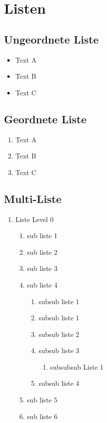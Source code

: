 \documentclass{scrreprt}
\begin{document}
	\chapter{Listen}
	\label{cha:listen}
	
	\section{Ungeordnete Liste}
	\label{se:ungerodneteli}
\begin{itemize}
	\item Text A
	\item Text B
	\item Text C
\end{itemize}
	
	\section{Geordnete Liste}
	\label{se:geordneteli}

\begin{enumerate}
	\item Text A
	\item Text B
	\item Text C
\end{enumerate}


	\section{Multi-Liste}
	\label{se:multili}
	
	\begin{enumerate}    
		\item Liste Level 0
		
		\begin{enumerate}
			\item sub liste 1
			\item sub liste 2
			\item sub liste 3
			\item sub liste 4
			
			\begin{enumerate}
				\item subsub liste 1
					\item subsub liste 1
			 		\item subsub liste 2
			 		\item subsub liste 3
			 		\begin{enumerate}
						\item  subsubsub Liste 1	 			
		 			\end{enumerate}
			 		\item subsub liste 4				
			\end{enumerate}
		\item sub liste 5
		\item sub liste 6
			
		\end{enumerate}
		
	\end{enumerate}
\end{document}

